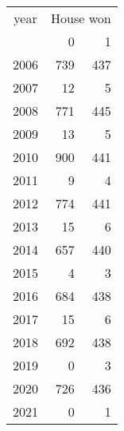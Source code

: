 \footnotesize\begin{tabular}[t]{lrr}
\toprule
\multicolumn{1}{c}{year} & \multicolumn{2}{c}{House won} \\
\cmidrule(l{3pt}r{3pt}){1-1} \cmidrule(l{3pt}r{3pt}){2-3}
  & 0 & 1\\
\midrule
2006 & 739 & 437\\
2007 & 12 & 5\\
2008 & 771 & 445\\
2009 & 13 & 5\\
2010 & 900 & 441\\
2011 & 9 & 4\\
2012 & 774 & 441\\
2013 & 15 & 6\\
2014 & 657 & 440\\
2015 & 4 & 3\\
2016 & 684 & 438\\
2017 & 15 & 6\\
2018 & 692 & 438\\
2019 & 0 & 3\\
2020 & 726 & 436\\
2021 & 0 & 1\\
\bottomrule
\end{tabular}
